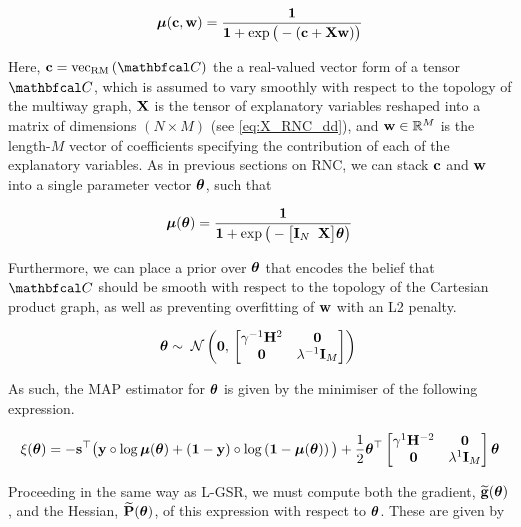 \begin{equation}
    \boldsymbol{\mu}(\mathbf{c}, \mathbf{w}) = \frac{\mathbf{1}}{\mathbf{1} + \exp\big(-(\mathbf{c} + \mathbf{X} \mathbf{w}) \big)}
\end{equation}

Here, $\cc = \vecrm{\Ct}$ the a real-valued vector form of a tensor $\Ct$, which is assumed to vary smoothly with respect to the topology of the multiway graph, $\mathbf{X}$ is the tensor of explanatory variables reshaped into a matrix of dimensions $(N \times M)$ (see \cref{eq:X_RNC_dd}), and $\mathbf{w} \in \mathbb{R}^M$ is the length-$M$ vector of coefficients specifying the contribution of each of the explanatory variables. As in previous sections on RNC, we can stack $\mathbf{c}$ and $\mathbf{w}$ into a single parameter vector $\boldsymbol{\theta}$, such that 

\begin{equation}
    \label{eq:lrnc_logistic}
    \boldsymbol{\mu}(\boldsymbol{\theta}) = \frac{\mathbf{1}}{\mathbf{1} + \exp\big(-\big[\mathbf{I}_N \;\; \mathbf{X} \big] \boldsymbol{\theta} \big)}
\end{equation}

Furthermore, we can place a prior over $\boldsymbol{\theta}$ that encodes the belief that $\Ct$ should be smooth with respect to the topology of the Cartesian product graph, as well as preventing overfitting of $\mathbf{w}$ with an L2 penalty. 

\begin{equation}
    \boldsymbol{\theta} \sim \; \mathcal{N}\left(\mathbf{0}, \, \begin{bmatrix}\gamma^{-1} \mathbf{H}^2 & \mathbf{0} \\
    \mathbf{0} & \lambda^{-1} \mathbf{I}_M \end{bmatrix}\right) \;
\end{equation}

As such, the MAP estimator for $\boldsymbol{\theta}$ is given by the minimiser of the following expression. 

\begin{equation}
    \label{eq:nll_logistic_rnc}
    \xi(\boldsymbol{\theta}) = -\mathbf{s}^\top \big(\mathbf{y} \circ \log \boldsymbol{\mu}(\boldsymbol{\theta}) + \left(\mathbf{1}  - \mathbf{y}\right) \circ \log \left(\mathbf{1} - \boldsymbol{\mu}(\boldsymbol{\theta}) \right)\big) + \frac{1}{2} \boldsymbol{\theta}^\top \begin{bmatrix}\gamma^{1} \mathbf{H}^{-2} & \mathbf{0} \\
        \mathbf{0} & \lambda^{1} \mathbf{I}_M \end{bmatrix}\boldsymbol{\theta}
\end{equation}

Proceeding in the same way as L-GSR, we must compute both the gradient, $\widetilde{\mathbf{g}}(\boldsymbol{\theta})$, and the Hessian, $\widetilde{\mathbf{P}}(\boldsymbol{\theta})$, of this expression with respect to $\boldsymbol{\theta}$. These are given by 

